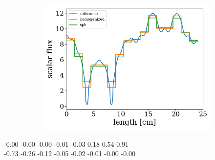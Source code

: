 \documentclass[fleqn]{beamer}
\begin{document}
\begin{frame}
\begin{figure}[htb]
\begin{subfigure}{0.5\textwidth}
                \label{fig:XS_H1}
            \end{subfigure}%
            \begin{subfigure}{0.5\textwidth}
                \centering
                \includegraphics[totalheight=0.5\textheight]{figures/scalar_flux}
                \label{fig:XS_U238}
            \end{subfigure}%
        \end{figure}
        -0.00  -0.00 -0.00 -0.01 -0.03  0.18  0.54  0.91 \\
        -0.73 -0.26 -0.12 -0.05 -0.02 -0.01 -0.00 -0.00
    \end{frame}
\end{document}
